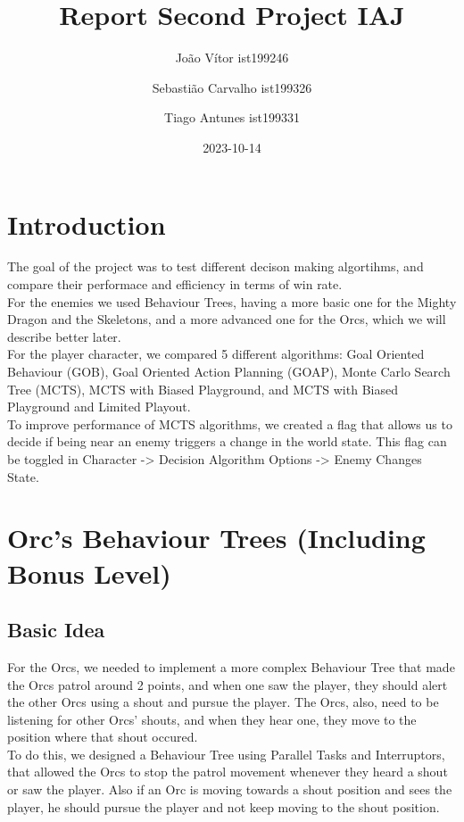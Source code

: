 \documentclass{article}
\title{Report Second Project IAJ}
\author{João Vítor ist199246
  \and Sebastião Carvalho ist199326
  \and Tiago Antunes ist199331}
\date{2023-10-14}
\begin{document}
  \maketitle
  \tableofcontents
  \newpage
  \section{Introduction}
  The goal of the project was to test different decison making algortihms, and compare their performace and efficiency in terms of win rate. \\
  For the enemies we used Behaviour Trees, having a more basic one for the Mighty Dragon and the Skeletons, and a more advanced one for the Orcs, 
  which we will describe better later.\\
  For the player character, we compared 5 different algorithms: Goal Oriented Behaviour (GOB), Goal Oriented Action Planning (GOAP), Monte Carlo Search Tree (MCTS),
  MCTS with Biased Playground, and MCTS with Biased Playground and Limited Playout.\\
  To improve performance of MCTS algorithms, we created a flag that allows us to decide if being near an enemy triggers a change in the world state. 
  This flag can be toggled in Character -> Decision Algorithm Options -> Enemy Changes State. 
  \section{Orc's Behaviour Trees (Including Bonus Level)}
  \subsection{Basic Idea}
  For the Orcs, we needed to implement a more complex Behaviour Tree that made the Orcs patrol around 2 points, and when one saw the player, they should alert the other Orcs
  using a shout and pursue the player. The Orcs, also, need to be listening for other Orcs' shouts, and when they hear one, they move to the position where that shout occured. \\
  To do this, we designed a Behaviour Tree using Parallel Tasks and Interruptors, that allowed the Orcs to stop the patrol movement whenever they heard a shout or 
  saw the player. Also if an Orc is moving towards a shout position and sees the player, he should pursue the player and not keep moving to the shout position.\\
\end{document}
